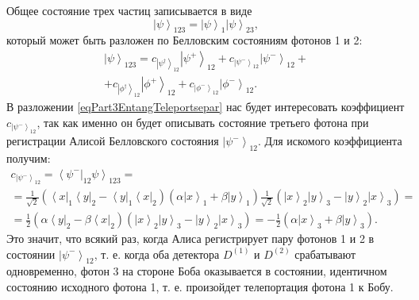 Общее состояние трех частиц записывается в виде
\begin{equation}
  \left|\psi\right>_{123} = \left|\psi\right>_1 \left|\psi\right>_{23},
  \nonumber
\end{equation}
который может быть разложен по Белловским состояниям фотонов 1 и 2:
\begin{eqnarray}
\left|\psi\right>_{123} = 
c_{\left|\psi^{\dag}\right>_{12}}\left|\psi^{+}\right>_{12} +
c_{\left|\psi^{-}\right>_{12}}\left|\psi^{-}\right>_{12} +
\nonumber \\
+
c_{\left|\phi^{\dag}\right>_{12}}\left|\phi^{+}\right>_{12} +
c_{\left|\phi^{-}\right>_{12}}\left|\phi^{-}\right>_{12}.
\label{eqPart3EntangTeleportsepar}
\end{eqnarray}
В разложении \eqref{eqPart3EntangTeleportsepar} нас будет интересовать
коэффициент 
$c_{\left|\psi^{-}\right>_{12}}$, так как именно он будет описывать
состояние третьего фотона при регистрации Алисой Белловского состояния 
$\left|\psi^{-}\right>_{12}$. Для искомого коэффициента получим:
\begin{eqnarray}
  c_{\left|\psi^{-}\right>_{12}} = 
  \left<\psi^{-}\right|_{12} \left.\psi\right>_{123} = 
  \nonumber \\
  =
  \frac{1}{\sqrt{2}}
  \left(
  \left<x\right|_1\left<y\right|_2 - 
  \left<y\right|_1\left<x\right|_2
  \right)
  \left(
  \alpha \left|x\right>_1 +
  \beta \left|y\right>_1
  \right)
  \frac{1}{\sqrt{2}}
  \left(
  \left|x\right>_2\left|y\right>_3 - 
  \left|y\right>_2\left|x\right>_3
  \right) = 
  \nonumber \\
  = \frac{1}{2}
  \left(
  \alpha\left<y\right|_2 - 
  \beta\left<x\right|_2
  \right)
  \left(
  \left|x\right>_2\left|y\right>_3 - 
  \left|y\right>_2\left|x\right>_3
  \right) = 
  - \frac{1}{2}  
  \left(
  \alpha \left|x\right>_3 +
  \beta \left|y\right>_3
  \right).
\nonumber
\end{eqnarray}
Это значит, что всякий раз, когда Алиса регистрирует пару фотонов 1 и 2
в состоянии $\left|\psi^{-}\right>_{12}$, т. е. когда оба детектора
$D^{(1)}$ и $D^{(2)}$ срабатывают одновременно, фотон 3 на стороне
Боба оказывается в состоянии, идентичном состоянию исходного фотона 1,
т. е. произойдет телепортация фотона 1  к Бобу.

